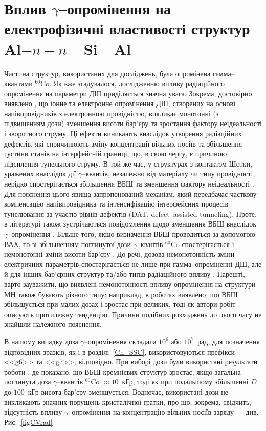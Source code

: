 \section{Вплив $\gamma$--опромінення на електрофізичні властивості структур Al$-n-n^+$--Si---Al\label{MSSi_Rad}}
Частина структур, використаних для досліджень, була опромінена гамма--квантами $^{60}$Co.
Як вже згадувалося, дослідженню впливу радіаційного опромінення на параметри ДШ приділяється значна увага.
Зокрема, достовірно виявлено \cite{Kumar1, Rao, Kumar2, Sharma, Ohyama}, що іонне та електронне опромінення ДШ,
створених на основі напівпровідників з електронною провідністю, викликає
монотонні (з підвищенням дози) зменшення висоти бар'єру та зростання фактору неідеальності і зворотного струму.
Ці ефекти виникають внаслідок утворення радіаційних дефектів, які спричинюють зміну концентрації вільних носіїв та
збільшення густини станів на інтерфейсній границі, що, в свою чергу, є причиною підсилення тунельного струму.
В той же час, у структурах з контактом Шотки, уражених внаслідок дії $\gamma$--квантів, незалежно від матеріалу чи типу провідності,
нерідко спостерігається збільшення ВБШ та зменшення фактору неідеальності \cite{Tataroglu,Tascioglu2010old,Tataroglu:2007NIMA}.
Для пояснення цього явища запропонований \cite{Tataroglu:2007NIMA} механізм, який передбачає
часткову компенсацію напівпровідника та інтенсифікацію інтерфейсних процесів тунелювання за участю рівнів дефектів (DAT, defect--assisted tunneling).
Проте, в літературі також зустрічаються повідомлення щодо зменшення ВБШ внаслідок $\gamma$--опромінення \cite{Tataroglu3}.
Більше того, якщо визначення ВБШ проводиться за допомогою ВАХ, то зі збільшенням поглинутої дози $\gamma$--квантів $^{60}$Co спостерігається
і немонотонні зміни висоти бар'єру \cite{Karatas:2006NIMA,Umana,Verma}.
До речі, дозова немонотонність зміни електричних параметрів спостерігається не лише при гамма--опроміненні ДШ,
але й для інших бар'єрних структур \cite{Kinoshita} та/або типів радіаційного впливу \cite{Vorobets, Pattabi, Kovalyuk}.
Нарешті, варто зауважити, що виявлені немонотонності впливу опромінення на структури МН також бувають різного типу:
наприклад, в роботах \cite{Karatas:2006NIMA, Vorobets, Pattabi} виявлено, що ВБШ збільшується
при малих дозах і зростає при великих, тоді як автори робіт \cite{Umana,Verma} описують протилежну тенденцію.
Причини подібних розходжень до цього часу не знайшли належного пояснення.

В нашому випадку доза $\gamma$--опромінення складала $10^6$ або $10^7$~рад, для позначення відповідних зразків, як і в розділі~\ref{Ch_SSC}, використовуються префікси <<g6>> та <<g7>>, відповідно.
При виборі дози були використані результати роботи \cite{Karatas:2006NIMA}, де показано,
що ВБШ кремнієвих структур зростає, якщо загальна поглинута доза $\gamma$--квантів $^{60}$Co $\approx10$~кГр, тоді як при подальшому збільшенні
$D$ до $100$~кГр висота бар'єру зменшується.
Водночас, використані дози не викликають значних порушень кристалічної ґратки,
про що, зокрема, свідчить, відсутність впливу $\gamma$--опромінення на концентрацію вільних носіїв заряду --- див. Рис.~\ref{figCVrad}

